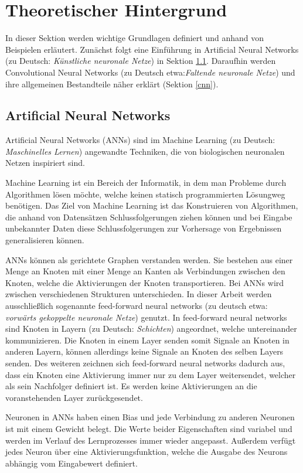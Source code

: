 \section{Theoretischer Hintergrund}
\label{th}
In dieser Sektion werden wichtige Grundlagen definiert und anhand von Beispielen erl\"autert. Zun\"achst folgt eine Einf\"uhrung in Artificial Neural Networks (zu Deutsch: \textit{Künstliche neuronale Netze}) in Sektion \ref{ann}. Daraufhin werden Convolutional Neural Networks (zu Deutsch etwa:\textit{Faltende neuronale Netze}) und ihre allgemeinen Bestandteile n\"aher erkl\"art (Sektion \ref{cnn}). 

\subsection{Artificial Neural Networks}
\label{ann}
Artificial Neural Networks (ANNs) sind im Machine Learning (zu Deutsch: \textit{Maschinelles Lernen}) angewandte Techniken, die von biologischen neuronalen Netzen inspiriert sind.  

Machine Learning ist ein Bereich der Informatik, in dem man Probleme durch Algorithmen l\"osen m\"ochte, welche keinen statisch programmierten L\"osungweg ben\"otigen. Das Ziel von Machine Learning ist das Konstruieren von Algorithmen, die anhand von Datens\"atzen Schlussfolgerungen ziehen k\"onnen und bei Eingabe unbekannter Daten diese Schlussfolgerungen zur Vorhersage von Ergebnissen generalisieren k\"onnen.

ANNs k\"onnen als gerichtete Graphen verstanden werden. Sie bestehen aus einer Menge an Knoten mit einer Menge an Kanten als Verbindungen zwischen den Knoten, welche die Aktivierungen der Knoten transportieren. Bei ANNs wird zwischen verschiedenen Strukturen unterschieden. In dieser Arbeit werden ausschlie\ss{}lich sogenannte feed-forward neural networks (zu deutsch etwa: \textit{vorw\"arts gekoppelte neuronale Netze}) genutzt. In feed-forward neural networks sind Knoten in Layern (zu Deutsch: \textit{Schichten}) angeordnet, welche untereinander kommunizieren. Die Knoten in einem Layer senden somit Signale an Knoten in anderen Layern, k\"onnen allerdings keine Signale an Knoten des selben Layers senden. Des weiteren zeichnen sich feed-forward neural networks dadurch aus, dass ein Knoten eine Aktivierung immer nur zu dem Layer weitersendet, welcher als sein Nachfolger definiert ist. Es werden keine Aktivierungen an die voranstehenden Layer zurückgesendet. 

Neuronen in ANNs haben einen Bias und jede Verbindung zu anderen Neuronen ist mit einem Gewicht belegt. Die Werte beider Eigenschaften sind variabel und werden im Verlauf des Lernprozesses immer wieder angepasst. Au\ss{}erdem verf\"ugt jedes Neuron über eine Aktivierungsfunktion, welche die Ausgabe des Neurons abhängig vom Eingabewert definiert.

